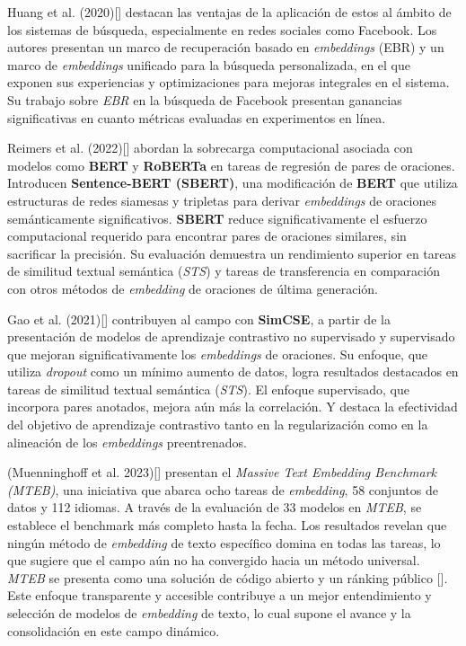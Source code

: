     Huang et al. (2020)[\cite{Huang_2020}] destacan las ventajas de la aplicación de estos al ámbito de los sistemas de búsqueda, especialmente en redes sociales como Facebook. Los autores presentan un marco de recuperación basado en \emph{embeddings} (EBR) y un marco de \emph{embeddings} unificado para la búsqueda personalizada, en el que exponen sus experiencias y optimizaciones para mejoras integrales en el sistema. Su trabajo sobre \emph{EBR} en la búsqueda de Facebook presentan ganancias significativas en cuanto métricas evaluadas en experimentos en línea.

    Reimers et al. (2022)[\cite{reimers2019sentencebert}] abordan la sobrecarga computacional asociada con modelos como \textbf{BERT} y \textbf{RoBERTa} en tareas de regresión de pares de oraciones. Introducen \textbf{Sentence-BERT (SBERT)}, una modificación de \textbf{BERT} que utiliza estructuras de redes siamesas y tripletas para derivar \emph{embeddings} de oraciones semánticamente significativos. \textbf{SBERT} reduce significativamente el esfuerzo computacional requerido para encontrar pares de oraciones similares, sin sacrificar la precisión. Su evaluación demuestra un rendimiento superior en tareas de similitud textual semántica (\emph{STS}) y tareas de transferencia en comparación con otros métodos de \emph{embedding} de oraciones de última generación.

    Gao et al. (2021)[\cite{gao2022simcse}] contribuyen al campo con \textbf{SimCSE}, a partir de la presentación de modelos de aprendizaje contrastivo no supervisado y supervisado que mejoran significativamente los \emph{embeddings} de oraciones. Su enfoque, que utiliza \emph{dropout} como un mínimo aumento de datos, logra resultados destacados en tareas de similitud textual semántica (\emph{STS}). El enfoque supervisado, que incorpora pares anotados, mejora aún más la correlación. Y destaca la efectividad del objetivo de aprendizaje contrastivo tanto en la regularización como en la alineación de los \emph{embeddings} preentrenados.

    (Muenninghoff et al. 2023)[\cite{muennighoff2023mteb}] presentan el \emph{Massive Text Embedding Benchmark (MTEB)}, una iniciativa que abarca ocho tareas de \emph{embedding}, 58 conjuntos de datos y 112 idiomas. A través de la evaluación de 33 modelos en \emph{MTEB}, se establece el benchmark más completo hasta la fecha. Los resultados revelan que ningún método de \emph{embedding} de texto específico domina en todas las tareas, lo que sugiere que el campo aún no ha convergido hacia un método universal. \emph{MTEB} se presenta como una solución de código abierto y un ránking público [\cite{leaderboard}]. Este enfoque transparente y accesible contribuye a un mejor entendimiento y selección de modelos de \emph{embedding} de texto, lo cual supone el avance y la consolidación en este campo dinámico.

